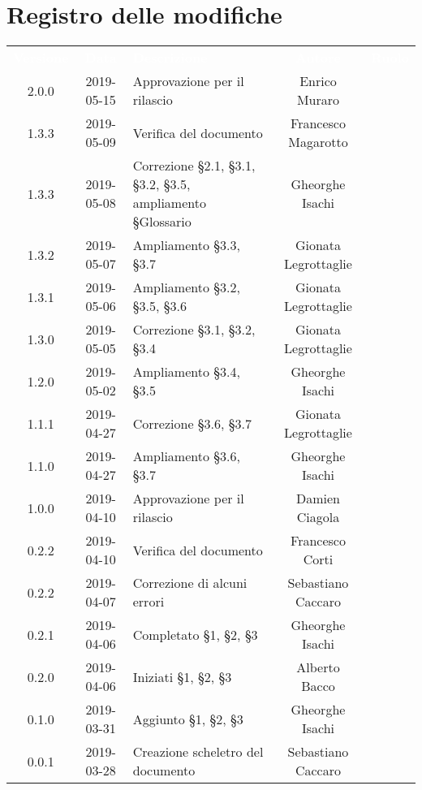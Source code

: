 \section*{Registro delle modifiche}
{
	\renewcommand{\arraystretch}{1.5}
	\centering
	\begin{longtable}{ c c C{6cm} c c }
		\textcolor{white}{\textbf{Versione}} & \textcolor{white}{\textbf{Data}} & \textcolor{white}{\textbf{Descrizione}} & \textcolor{white}{\textbf{Autore}} & \textcolor{white}{\textbf{Ruolo}}\\
		2.0.0 & 2019-05-15 & Approvazione per il rilascio & Enrico Muraro & \Res{} \\
		
		1.3.3 &  2019-05-09 & Verifica del documento & Francesco Magarotto & \ver{} \\ 
				
		1.3.3 & 2019-05-08 & Correzione \S2.1, \S3.1, \S3.2, \S3.5, ampliamento \S Glossario & Gheorghe Isachi & \reda{} \\
		
		1.3.2 & 2019-05-07 & Ampliamento \S3.3, \S3.7 & Gionata Legrottaglie & \reda{} \\
		
		1.3.1 & 2019-05-06 & Ampliamento \S3.2, \S3.5, \S3.6 & Gionata Legrottaglie & \reda{} \\
				
		1.3.0 & 2019-05-05 & Correzione \S3.1, \S3.2, \S3.4 & Gionata Legrottaglie & \reda{} \\
				
		1.2.0 & 2019-05-02 & Ampliamento \S3.4, \S3.5 & Gheorghe Isachi & \reda{} \\	
		
		1.1.1 & 2019-04-27 & Correzione \S3.6, \S3.7 & Gionata Legrottaglie & \reda{} \\	
		
		1.1.0 & 2019-04-27 & Ampliamento \S3.6, \S3.7 & Gheorghe Isachi & \reda{} \\
		
		1.0.0 & 2019-04-10 & Approvazione per il rilascio & Damien Ciagola & \Res{} \\ 
			
		0.2.2 & 2019-04-10 & Verifica del documento & Francesco Corti & \ver{} \\ 
		
		0.2.2 & 2019-04-07 & Correzione di alcuni errori & Sebastiano Caccaro & \reda{} \\ 

		0.2.1 & 2019-04-06 & Completato \S1, \S2, \S3 & Gheorghe Isachi & \reda{} \\
		
		0.2.0 & 2019-04-06 & Iniziati \S1, \S2, \S3 & Alberto Bacco & \reda{} \\
		
		0.1.0 & 2019-03-31 & Aggiunto \S1, \S2, \S3 & Gheorghe Isachi & \reda{} \\
		
		0.0.1 & 2019-03-28 & Creazione scheletro del documento & Sebastiano Caccaro & \reda{}
		
	\end{longtable}

}